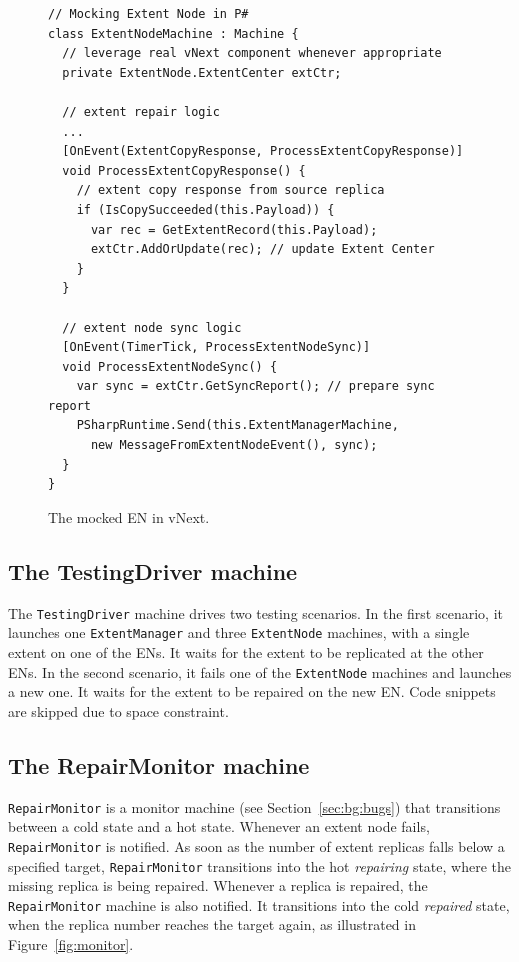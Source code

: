 \begin{figure}[t]
\begin{lstlisting}
// Mocking Extent Node in P#
class ExtentNodeMachine : Machine {
  // leverage real vNext component whenever appropriate
  private ExtentNode.ExtentCenter extCtr;

  // extent repair logic
  ...
  [OnEvent(ExtentCopyResponse, ProcessExtentCopyResponse)]
  void ProcessExtentCopyResponse() {
    // extent copy response from source replica
    if (IsCopySucceeded(this.Payload)) {
      var rec = GetExtentRecord(this.Payload);
      extCtr.AddOrUpdate(rec); // update Extent Center
    }
  }

  // extent node sync logic
  [OnEvent(TimerTick, ProcessExtentNodeSync)]
  void ProcessExtentNodeSync() {
    var sync = extCtr.GetSyncReport(); // prepare sync report
    PSharpRuntime.Send(this.ExtentManagerMachine,
      new MessageFromExtentNodeEvent(), sync);
  }
}
\end{lstlisting}
\vspace{-2mm}
\caption{The mocked EN in vNext.}
\label{fig:mocked_en}
\end{figure}

\subsection{The TestingDriver machine}
\label{sec:method:driver}

The \texttt{TestingDriver} machine drives two testing scenarios. In the first scenario, it launches one \texttt{ExtentManager} and three \texttt{ExtentNode} machines, with a single extent on one of the ENs. It waits for the extent to be replicated at the other ENs. In the second scenario, it fails one of the \texttt{ExtentNode} machines and launches a new one. It waits for the extent to be repaired on the new EN. Code snippets are skipped due to space constraint.

\subsection{The RepairMonitor machine}
\label{sec:method:monitor}

\texttt{RepairMonitor} is a monitor machine (see Section~\ref{sec:bg:bugs}) that transitions between a cold state and a hot state. Whenever an extent node fails, \texttt{RepairMonitor} is notified. As soon as the number of extent replicas falls below a specified target, \texttt{RepairMonitor} transitions into the hot \emph{repairing} state, where the missing replica is being repaired. Whenever a replica is repaired, the \texttt{RepairMonitor} machine is also notified. It transitions into the cold \emph{repaired} state, when the replica number reaches the target again, as illustrated in Figure~\ref{fig:monitor}.

